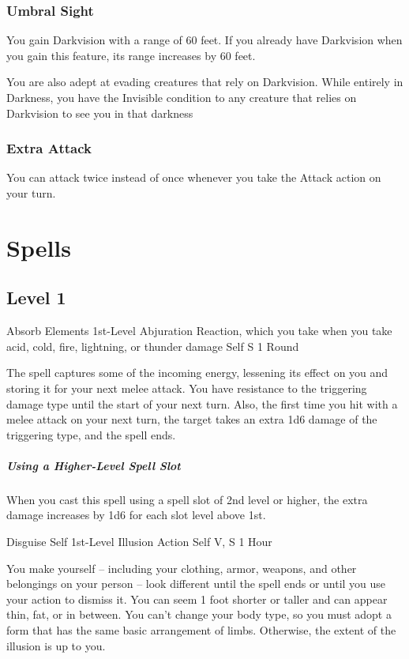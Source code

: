 \documentclass[letterpaper,openany,oneside,twocolumn]{book}
\begin{document}
\subsubsection*{Umbral Sight}
You gain Darkvision with a range of 60 feet. If you already have Darkvision when you gain this feature, its range increases by 60 feet.

You are also adept at evading creatures that rely on Darkvision. While entirely in Darkness, you have the Invisible condition to any creature that relies on Darkvision to see you in that darkness
\subsubsection*{Extra Attack}
You can attack twice instead of once whenever you take the Attack action on your turn.

\section*{Spells}
\subsection*{Level 1}

\DndSpellHeader
  {Absorb Elements}
  {1st-Level Abjuration}
  {Reaction, which you take when you take acid, cold, fire, lightning, or thunder damage}
  {Self}
  {S}
  {1 Round}

The spell captures some of the incoming energy, lessening its effect on you and storing it for your next melee attack. You have resistance to the triggering damage type until the start of your next turn. Also, the first time you hit with a melee attack on your next turn, the target takes an extra 1d6 damage of the triggering type, and the spell ends.

\subparagraph*{Using a Higher-Level Spell Slot} When you cast this spell using a spell slot of 2nd level or higher, the extra damage increases by 1d6 for each slot level above 1st.

\DndSpellHeader
  {Disguise Self}
  {1st-Level Illusion}
  {Action}
  {Self}
  {V, S}
  {1 Hour}

You make yourself – including your clothing, armor, weapons, and other belongings on your person – look different until the spell ends or until you use your action to dismiss it. You can seem 1 foot shorter or taller and can appear thin, fat, or in between. You can't change your body type, so you must adopt a form that has the same basic arrangement of limbs. Otherwise, the extent of the illusion is up to you.
\end{document}
